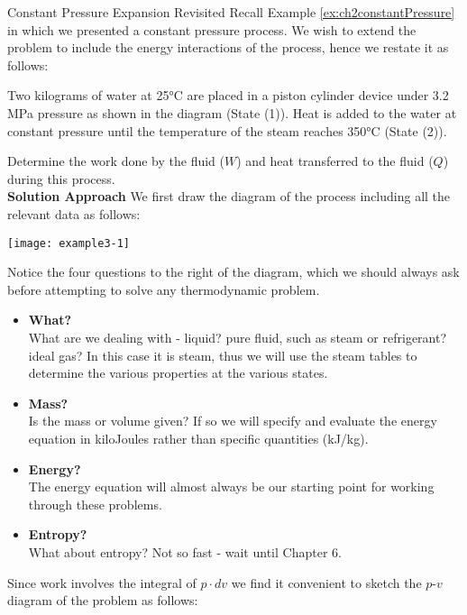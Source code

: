 \begin{example}[label={ex:constantPressureRevisited}]{Constant Pressure Expansion Revisited}
  Recall Example \ref{ex:ch2constantPressure} in which we presented a constant pressure process. We wish to extend the problem to include the energy interactions of the process, hence we restate it as follows:

  Two kilograms of water at 25°C are placed in a piston cylinder device under 3.2 MPa pressure as shown in the diagram (State (1)). Heat is added to the water at constant pressure until the temperature of the steam reaches 350°C (State (2)).

  Determine the work done by the fluid ($W$) and heat transferred to the fluid ($Q$) during this process.\\

  {\bf Solution Approach}
  We first draw the diagram of the process including all the relevant data as follows:

\begin{center}
\texttt{[image: example3-1]}
\end{center}

Notice the four questions to the right of the diagram, which we should always ask before attempting to solve any thermodynamic problem.

\begin{itemize}
  \item {\bf What?} \\
What are we dealing with - liquid? pure fluid, such as steam or refrigerant? ideal gas? In this case it is steam, thus we will use the steam tables to determine the various properties at the various states.

\item {\bf Mass?} \\
Is the mass or volume given? If so we will specify and evaluate the energy equation in kiloJoules rather than specific quantities (kJ/kg).

\item {\bf Energy?}\\
  The energy equation will almost always be our starting point for working through these problems.

\item {\bf Entropy?}\\
What about entropy? Not so fast - wait until Chapter 6.
\end{itemize}
Since work involves the integral of $p\cdot dv$ we find it convenient to sketch the $p$-$v$ diagram of the problem as follows:


\end{example}
